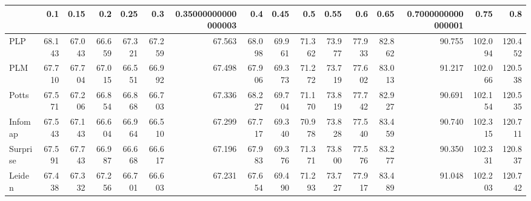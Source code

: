 \begin{tabular}{lrrrrrrrrrrrrrrr}
\toprule
{} &    0.1 &   0.15 &    0.2 &   0.25 &    0.3 & 0.35000000000000003 &    0.4 &   0.45 &    0.5 &   0.55 &    0.6 &   0.65 & 0.7000000000000001 &    0.75 &     0.8 \\
\midrule
PLP      & 68.143 & 67.043 & 66.659 & 67.321 & 67.259 &              67.563 & 68.098 & 69.961 & 71.362 & 73.977 & 77.933 & 82.862 &             90.755 & 102.094 & 120.452 \\
PLM      & 67.710 & 67.704 & 67.015 & 66.551 & 66.992 &              67.498 & 67.906 & 69.373 & 71.272 & 73.719 & 77.602 & 83.013 &             91.217 & 102.066 & 120.538 \\
Potts    & 67.571 & 67.206 & 66.854 & 66.868 & 66.703 &              67.336 & 68.227 & 69.704 & 71.170 & 73.819 & 77.742 & 82.927 &             90.691 & 102.154 & 120.535 \\
Infomap  & 67.543 & 67.143 & 66.604 & 66.964 & 66.510 &              67.299 & 67.717 & 69.340 & 70.978 & 73.828 & 77.540 & 83.459 &             90.740 & 102.315 & 120.711 \\
Surprise & 67.591 & 67.743 & 66.987 & 66.668 & 66.617 &              67.196 & 67.983 & 69.376 & 71.371 & 73.800 & 77.576 & 83.277 &             90.350 & 102.331 & 120.837 \\
Leiden   & 67.438 & 67.332 & 67.256 & 66.701 & 66.603 &              67.231 & 67.654 & 69.490 & 71.293 & 73.727 & 77.917 & 83.489 &             91.048 & 102.203 & 120.742 \\
\bottomrule
\end{tabular}
